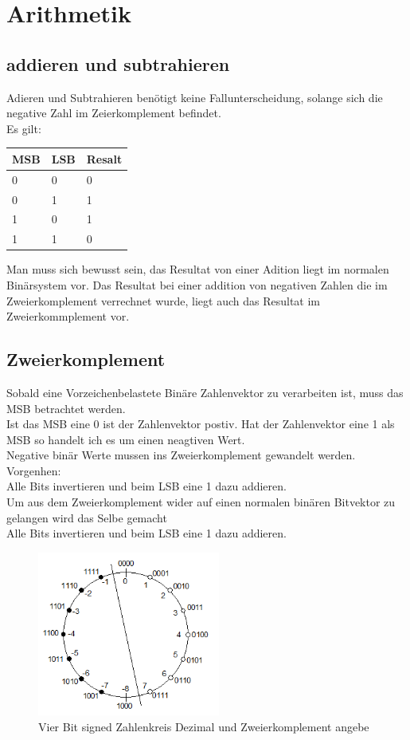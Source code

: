 \section{Arithmetik}
\subsection{addieren und subtrahieren}
Adieren und Subtrahieren benötigt keine Fallunterscheidung, solange sich die negative Zahl im Zeierkomplement befindet.\\
Es gilt:\\
\begin{table}[h]
\begin{tabular}{ll|l}

MSB & LSB & Resalt \\ \hline
0   & 0   & 0      \\ 
0   & 1   & 1      \\ 
1   & 0   & 1      \\ 
1   & 1   & 0      \\ 
\end{tabular}
\end{table}

Man muss sich bewusst sein, das Resultat von einer Adition liegt im normalen Binärsystem vor. Das Resultat bei einer addition von negativen Zahlen die im Zweierkomplement verrechnet wurde, liegt auch das Resultat im Zweierkommplement vor.

\subsection{Zweierkomplement}
Sobald eine Vorzeichenbelastete Binäre Zahlenvektor zu verarbeiten ist, muss das MSB betrachtet werden.\\
Ist das MSB eine 0 ist der Zahlenvektor postiv. Hat der Zahlenvektor eine 1 als MSB so handelt ich es um einen neagtiven Wert.
\\
Negative binär Werte mussen ins Zweierkomplement gewandelt werden.\\
Vorgenhen:\\
Alle Bits invertieren und beim LSB eine 1 dazu addieren.
\\
Um aus dem Zweierkomplement wider auf einen normalen binären Bitvektor zu gelangen wird das Selbe gemacht\\
Alle Bits invertieren und beim LSB eine 1 dazu addieren.
\begin{figure}[htbp]
	\centering
		\includegraphics[width=6cm]{content/bilder/Zahlenkreis.png}
	\caption{Vier Bit signed Zahlenkreis Dezimal und Zweierkomplement angebe}%
	\label{Zahlenkreis}
\end{figure}


